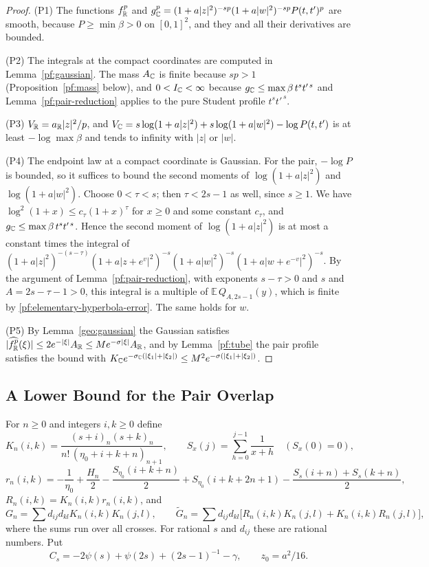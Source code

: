 \begin{proof}
(P1) The functions $f_\mathbb R^p$ and
$g_\mathbb C^p=(1+a|z|^2)^{-sp}(1+a|w|^2)^{-sp}P(t,t')^p$ are smooth, because
$P\ge\min\beta>0$ on $[0,1]^2$, and they and all their derivatives are
bounded.

(P2) The integrals at the compact coordinates are computed in
Lemma~\ref{pf:gaussian}. The mass $A_\mathbb C$ is finite because $sp>1$
(Proposition~\ref{pf:mass} below), and $0<I_\mathbb C<\infty$ because
$g_\mathbb C\le\max\beta\,t^st'^{\,s}$ and Lemma~\ref{pf:pair-reduction}
applies to the pure Student profile $t^st'^{\,s}$.

(P3) $V_\mathbb R=a_\mathbb R|z|^2/p$, and
$V_\mathbb C=s\log(1+a|z|^2)+s\log(1+a|w|^2)-\log P(t,t')$ is at least
$-\log\max\beta$ and tends to infinity with $|z|$ or $|w|$.

(P4) The endpoint law at a compact coordinate is Gaussian. For the pair,
$-\log P$ is bounded, so it suffices to bound the second moments of
$\log(1+a|z|^2)$ and $\log(1+a|w|^2)$. Choose $0<\tau<s$; then
$\tau<2s-1$ as well, since $s\ge1$. We have
$\log^2(1+x)\le c_\tau(1+x)^\tau$ for $x\ge0$ and some constant
$c_\tau$, and $g_\mathbb C\le\max\beta\,t^st'^{\,s}$. Hence the second moment
of $\log(1+a|z|^2)$ is at most a constant times the integral of
$(1+a|z|^2)^{-(s-\tau)}(1+a|z+e^v|^2)^{-s}(1+a|w|^2)^{-s}
(1+a|w+e^{-v}|^2)^{-s}$. By the argument of
Lemma~\ref{pf:pair-reduction}, with exponents $s-\tau>0$ and $s$ and
$A=2s-\tau-1>0$, this integral is a multiple of
$\mathbb E\,Q_{A,2s-1}(y)$, which is finite by
\eqref{pf:elementary-hyperbola-error}. The same holds for $w$.

(P5) By Lemma~\ref{geo:gaussian} the Gaussian satisfies
$|\widehat{f_\mathbb R^p}(\xi)|\le2e^{-|\xi|}A_\mathbb R\le Me^{-\sigma|\xi|}A_\mathbb R$, and by
Lemma~\ref{pf:tube} the pair profile satisfies the bound with
$K_\mathbb C e^{-\sigma_\mathbb C(|\xi_1|+|\xi_2|)}\le
M^2e^{-\sigma(|\xi_1|+|\xi_2|)}$.
\end{proof}

\subsection{A Lower Bound for the Pair Overlap}
For $n\ge0$ and integers $i,k\ge0$ define
\[
 K_n(i,k)=\frac{(s+i)_n(s+k)_n}{n!\,(\eta_0+i+k+n)_{n+1}},\qquad
 S_x(j)=\sum_{h=0}^{j-1}\frac1{x+h}\quad(S_x(0)=0),
\]
\[
 r_n(i,k)=-\frac1{\eta_0}+\frac{H_n}2-\frac{S_{\eta_0}(i+k+n)}2
 +S_{\eta_0}(i+k+2n+1)-\frac{S_s(i+n)+S_s(k+n)}2,
\]
$R_n(i,k)=K_n(i,k)r_n(i,k)$, and
\[
 G_n=\sum d_{ij}d_{kl}K_n(i,k)K_n(j,l),\qquad
 \widetilde G_n=\sum d_{ij}d_{kl}\bigl[R_n(i,k)K_n(j,l)+K_n(i,k)R_n(j,l)\bigr],
\]
where the sums run over all crosses. For rational $s$ and $d_{ij}$ these
are rational numbers. Put
\begin{equation}\label{pf:student-constant}
 C_s=-2\psi(s)+\psi(2s)+(2s-1)^{-1}-\gamma ,\qquad z_0=a^2/16 .
\end{equation}

